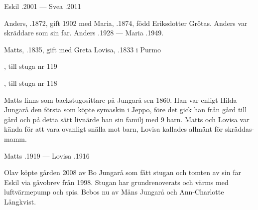 Eskil .2001  ---  Svea .2011





Anders, .1872, gift 1902 med Maria, .1874, född Eriksdotter Grötas. Anders var skräddare som sin far. Anders .1928  ---   Maria .1949.\jhvspace{}


Matts, .1835, gift med Greta Lovisa, .1833 i Purmo
\begin{jhchildren}
  \item {}
  \item {}
  \item {}
  \item {}
  \item {}
  \item {}
  \item {}, till stuga nr 119
  \item {}, till stuga nr 118
  \item {}
\end{jhchildren}
Matts finns som backstugosittare på Jungarå sen 1860. Han var enligt Hilda Jungarå den första som köpte symaskin i Jeppo, före det gick han från gård till gård och på detta sätt livnärde han sin familj med 9 barn. Matts och Lovisa var kända för att vara ovanligt snälla mot barn, Lovisa kallades allmänt för skräddas-mamm.

Matts .1919  ---  Lovisa .1916




Olav köpte gården 2008 av Bo Jungarå som fått stugan och tomten av sin far Eskil via gåvobrev från 1998. Stugan har grundrenoverats och värms med luftvärmepump och spis. Bebos nu av Måns Jungarå och Ann-Charlotte Långkvist.


